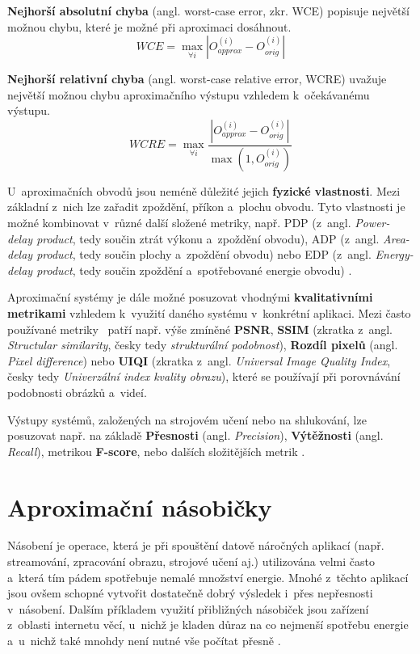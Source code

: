 \textbf{Nejhorší absolutní chyba} (angl. worst-case error, zkr. WCE) popisuje největší možnou chybu, které je možné při aproximaci dosáhnout.
\begin{equation}
    WCE = \max_{\forall i} \left|{O_{approx}^{(i)} - O_{orig}^{(i)}}\right|
\end{equation}

\textbf{Nejhorší relativní chyba} (angl. worst-case relative error, WCRE) uvažuje největší možnou chybu aproximačního výstupu vzhledem k~očekávanému výstupu.
\begin{equation}
    WCRE = \max_{\forall i} \frac{\left|{O_{approx}^{(i)} - O_{orig}^{(i)}}\right|} {\max(1,O_{orig}^{(i)})} 
\end{equation}

\bigskip

U~aproximačních obvodů jsou neméně důležité jejich \textbf{fyzické vlastnosti}. Mezi základní z~nich lze zařadit zpoždění, příkon a~plochu obvodu. Tyto vlastnosti je možné kombinovat v~různé další složené metriky, např. PDP (z~angl. \textit{Power-delay product}, tedy součin ztrát výkonu a~zpoždění obvodu), ADP (z~angl. \textit{Area-delay product}, tedy součin plochy a~zpoždění obvodu) nebo EDP (z~angl. \textit{Energy-delay product}, tedy součin zpoždění a~spotřebované energie obvodu) \cite{approx_arith_circuits}.

\bigskip

Aproximační systémy je dále možné posuzovat vhodnými \textbf{kvalitativními metrikami} vzhledem k~využití daného systému v~konkrétní aplikaci. Mezi často používané metriky~\cite{ac_techniques} patří např. výše zmíněné \textbf{PSNR}, \textbf{SSIM} (zkratka z~angl. \textit{Structular similarity}, česky tedy \textit{strukturální podobnost}), \textbf{Rozdíl pixelů} (angl. \textit{Pixel difference}) nebo \textbf{UIQI} (zkratka z~angl. \textit{Universal Image Quality Index}, česky tedy \textit{Univerzální index kvality obrazu}), které se používají při porovnávání podobnosti obrázků a~videí.

Výstupy systémů, založených na strojovém učení nebo na shlukování, lze posuzovat např. na základě \textbf{Přesnosti} (angl. \textit{Precision}), \textbf{Výtěžnosti} (angl. \textit{Recall}), metrikou \textbf{F-score}, nebo dalších složitějších metrik \cite{clustering_eval}.

\section{Aproximační násobičky} \label{approx_mult}
Násobení je operace, která je při spouštění datově náročných aplikací (např. streamování, zpracování obrazu, strojové učení aj.) utilizována velmi často a~která tím pádem spotřebuje nemalé množství energie. Mnohé z~těchto aplikací jsou ovšem schopné vytvořit dostatečně dobrý výsledek i~přes nepřesnosti v~násobení. Dalším příkladem využití přibližných násobiček jsou zařízení z~oblasti internetu věcí, u~nichž je kladen důraz na co nejmenší spotřebu energie a~u~nichž také mnohdy není nutné vše počítat přesně \cite{approx_mult_survey}.

